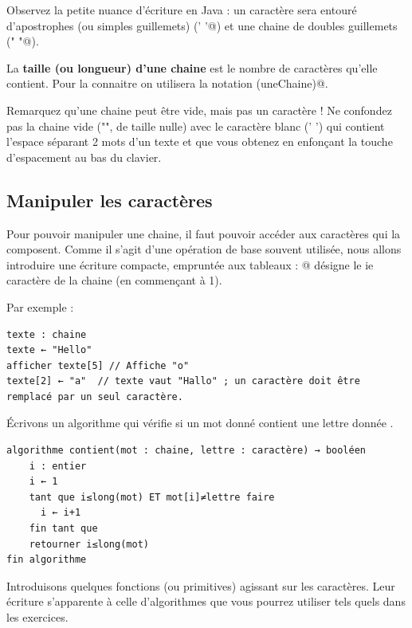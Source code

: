 \documentclass[11pt,a4paper]{article}
\begin{document}
        Observez la petite nuance d'\'ecriture en Java : 
        un caract\`ere sera entour\'e d'apostrophes (ou simples guillemets) (\verb@’ ’@) 
        et une chaine de doubles guillemets (\verb@" "@).
      
            \par
        
        La \textbf{taille (ou longueur) d'une chaine} est le nombre de caract\`eres qu'elle contient. 
        Pour la connaitre on utilisera la notation \verb@long(uneChaine)@.
      
            \par
        
        Remarquez qu'une chaine peut \^etre vide, mais pas un caract\`ere ! Ne confondez pas la chaine vide ("", de
        taille nulle) avec le caract\`ere blanc (' ') qui contient l'espace s\'eparant 2 mots d'un texte et
        que vous obtenez en enfon\c cant la touche d'espacement au bas du clavier.
		
            \par
        \subsection{Manipuler les caract\`eres}
		    Pour pouvoir manipuler une chaine, il faut pouvoir acc\'eder aux caract\`eres qui la composent.
        Comme il s'agit d'une op\'eration de base souvent utilis\'ee, nous allons introduire une \'ecriture 
        compacte, emprunt\'ee aux tableaux : \verb@nomChaine[i]@ 
        d\'esigne le ie caract\`ere de la chaine \verb@nomChaine@ (en commen\c cant \`a 1).
		  
            \par
        
		    Par exemple :
		  
            \par
        \begin{verbatim}
texte : chaine
texte ← "Hello"
afficher texte[5] // Affiche "o"
texte[2] ← "a"  // texte vaut "Hallo" ; un caractère doit être remplacé par un seul caractère.
		  \end{verbatim}
		    \'Ecrivons un algorithme qui v\'erifie si un mot donn\'e contient une lettre donn\'ee
      .
            \par
        \begin{verbatim}
algorithme contient(mot : chaine, lettre : caractère) → booléen
    i : entier
    i ← 1
    tant que i≤long(mot) ET mot[i]≠lettre faire
      i ← i+1
    fin tant que
    retourner i≤long(mot)
fin algorithme
		  \end{verbatim}
        Introduisons quelques fonctions (ou primitives) agissant sur les caract\`eres. Leur \'ecriture
        s'apparente \`a celle d'algorithmes que vous pourrez utiliser tels quels dans les exercices. 
      
\end{document}
